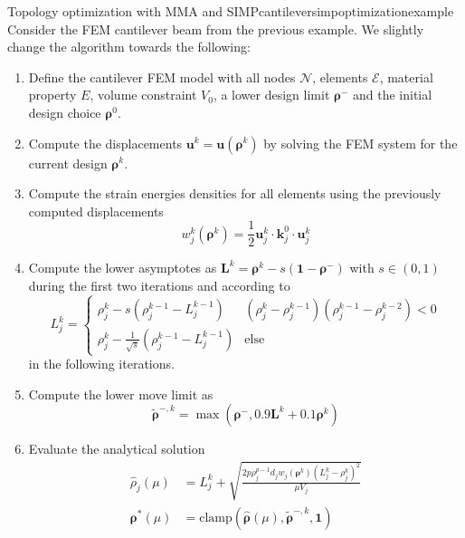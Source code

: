 \begin{example}{Topology optimization with MMA and SIMP}{cantileversimpoptimizationexample}
    Consider the FEM cantilever beam from the previous example. We slightly change the algorithm towards the following:  
    \begin{enumerate}
        \item Define the cantilever FEM model with all nodes $\mathcal{N}$, elements $\mathcal{E}$, material property $E$, volume constraint $V_0$, a lower design limit $\pmb{\rho}^-$ and the initial design choice $\pmb{\rho}^0$.
        \item Compute the displacements $\mathbf{u}^k = \mathbf{u}(\pmb{\rho}^k)$ by solving the FEM system for the current design $\pmb{\rho}^k$.
        \item Compute the strain energies densities for all elements using the previously computed displacements   
        \begin{equation}
            w^k_j(\pmb{\rho}^k) = \frac{1}{2}\mathbf{u}^k_j \cdot \mathbf{k}^0_j \cdot \mathbf{u}^k_j
        \end{equation}
        \item Compute the lower asymptotes as $\mathbf{L}^k =\pmb{\rho}^k - s (\mathbf{1} - \pmb{\rho}^-)$ with $s \in (0,1)$ during the first two iterations and according to 
        \begin{equation}
            L^k_j = 
            \begin{cases}
                \rho^k_j - s  (\rho^{k-1}_j-L^{k-1}_j) & (\rho_j^k-\rho_j^{k-1})(\rho_j^{k-1}-\rho_j^{k-2}) < 0\\
                \rho^k_j - \frac{1}{\sqrt{s}}  (\rho^{k-1}_j-L^{k-1}_j) & \text{else}
            \end{cases}
        \end{equation}
        in the following iterations.
        \item Compute the lower move limit as 
        \begin{equation}
            \tilde{\pmb{\rho}}^{-,k} = \max(\pmb{\rho}^-,  0.9 \mathbf{L}^k + 0.1 \pmb{\rho}^k)
        \end{equation}
        \item Evaluate the analytical solution
            \begin{align}
                \hat{\rho}_j(\mu) &= L_j^k + \sqrt{\frac{2 p \rho_j^{p-1} d_j w_j (\pmb{\rho}^k)
                (L^k_j-\rho^k_j)^2}{\mu V_j}} \\
                \pmb{\rho}^* (\mu) &= \textrm{clamp}\left(\hat{\pmb{\rho}}(\mu), \tilde{\pmb{\rho}}^{-,k}, \mathbf{1}\right)

\end{align}
\end{enumerate}
\end{example}
